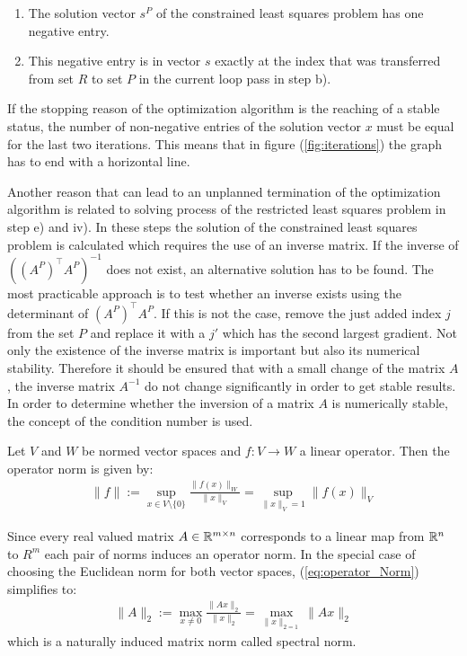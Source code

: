 \begin{enumerate}
	\item The solution vector $s^P$ of the constrained least squares problem has one negative entry.
	\item This negative entry is in vector $s$ exactly at the index that was transferred from set $R$ to set $P$ in the current loop pass in step b).
\end{enumerate}


\begin{remark}
	If the stopping reason of the optimization algorithm is the reaching of a stable status, the number of non-negative entries of the solution vector $x$ must be equal for the last two iterations. This means that in figure (\ref{fig:iterations}) the graph has to end with a horizontal line.
\end{remark}

Another reason that can lead to an unplanned termination of the optimization algorithm is related to solving process of the restricted least squares problem in step e) and iv). In these steps the solution of the constrained least squares problem is calculated which requires the use of an inverse matrix. If the inverse of $((A^P)^\top A^P)^{-1}$ does not exist, an alternative solution has to be found. The most practicable approach is to test whether an inverse exists using the determinant of $(A^P)^\top A^P$. If this is not the case, remove the just added index $j$ from the set $P$ and replace it with a $j'$ which has the second largest gradient. 
Not only the existence of the inverse matrix is important but also its numerical stability. Therefore it should be ensured that with a small change of the matrix $A$, the inverse matrix $A^{-1}$ do not change significantly in order to get stable results. In order to determine whether the inversion of a matrix $A$ is numerically stable, the concept of the condition number is used.

\begin{definition}
	Let $V$ and $W$ be normed vector spaces and $f:V \to W$ a linear operator. Then the operator norm is given by: 
	\begin{align}\label{eq:operator_Norm}
		\lVert f \rVert := \sup_{x \in V \setminus \{0\}} \frac{\lVert f(x) \rVert_W}{\lVert x \rVert_V} = \sup_{\lVert x \rVert_{V} = 1} \lVert f(x) \rVert_V
	\end{align}
\end{definition}

\begin{remark}
	Since every real valued matrix $A \in \mathbb{R}^{m \times n}$ corresponds to a linear map from $\mathbb{R}^n$ to $R^m$ each pair of norms induces an operator norm. In the special case of choosing the Euclidean norm for both vector spaces, (\ref{eq:operator_Norm}) simplifies to:
	\begin{align}\label{eq:matrix_Norm}
		\lVert A \rVert_2 := \max_{x \neq 0} \frac{\lVert Ax \rVert_2}{\lVert x \rVert_2} = \max_{\lVert x \rVert_{2 = 1}} \lVert Ax \rVert_2
	\end{align}	
	which is a naturally induced matrix norm called spectral norm. 
\end{remark}

